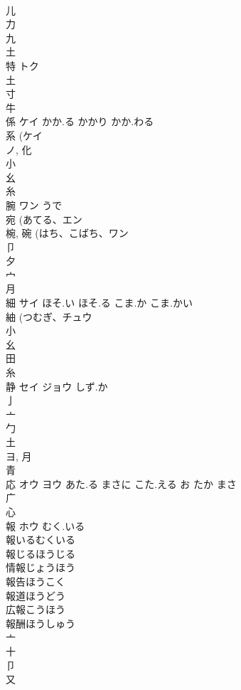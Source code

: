 \documentclass[8pt]{extreport}
\begin{document}
\begin{CJK}{UTF8}{min}
\\	儿 
\\	力 
\\	九 
\\	土 
\\	特	トク		
\\	土 
\\	寸 
\\	牛 
\\	係	ケイ	かか.る かかり かか.わる	
\\	系 (ケイ 
\\	ノ, 化 
\\	小 
\\	幺 
\\	糸 
\\	腕	ワン	うで	
\\	宛 (あてる、エン 
\\	椀, 碗 (はち、こばち、ワン 
\\	卩 
\\	夕 
\\	宀 
\\	月 
\\	細	サイ	ほそ.い ほそ.る こま.か こま.かい	
\\	紬 (つむぎ、チュウ 
\\	小 
\\	幺 
\\	田 
\\	糸 
\\	静	セイ ジョウ	しず.か	
\\	亅 
\\	亠 
\\	勹 
\\	土 
\\	ヨ, 月 
\\	青 
\\	応	オウ ヨウ	あた.る まさに こた.える お たか まさ	
\\	广 
\\	心 
\\	報	ホウ	むく.いる	
\\	報いるむくいる 
\\	報じるほうじる 
\\	情報じょうほう 
\\	報告ほうこく 
\\	報道ほうどう 
\\	広報こうほう 
\\	報酬ほうしゅう 
\\	亠 
\\	十 
\\	卩 
\\	又 

\end{CJK}
\end{document}
